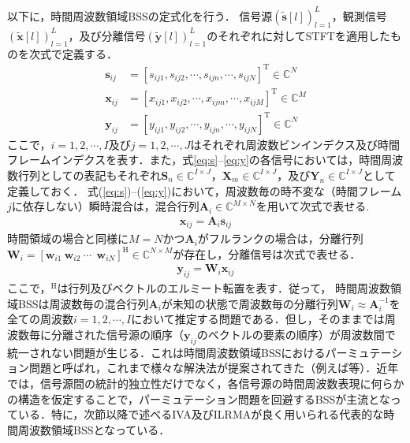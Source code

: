 以下に，時間周波数領域BSSの定式化を行う．
信号源$( \tilde{\bm{s}}[l] )_{l=1}^L$，観測信号$( \tilde{\bm{x}}[l] )_{l=1}^L$，及び分離信号$( \tilde{\bm{y}}[l] )_{l=1}^L$のそれぞれに対して{STFTを適用したものを次式で定義する．}
\begin{align}
\bm{s}_{ij} &= [s_{ij1}, s_{ij2}, \cdots, s_{ijn}, \cdots, s_{ijN}]^{\mathrm{T}} \in \mathbb{C}^{N} \label{eq:s} \\
\bm{x}_{ij} &= [x_{ij1}, x_{ij2}, \cdots, x_{ijm}, \cdots, x_{ijM}]^{\mathrm{T}} \in \mathbb{C}^{M} \label{eq:x} \\
\bm{y}_{ij} &= [y_{ij1}, y_{ij2}, \cdots, y_{ijn}, \cdots, y_{ijN}]^{\mathrm{T}} \in \mathbb{C}^{N} \label{eq:y}
\end{align}
ここで，$i=1, 2,  \cdots, I$及び$j=1, 2,  \cdots, J$はそれぞれ周波数ビンインデクス及び時間フレームインデクスを表す．また，式\eqref{eq:s}--\eqref{eq:y}の各信号においては，時間周波数行列としての表記もそれぞれ$\bm{S}_n\in\mathbb{C}^{{I\times J}}$，$\bm{X}_m\in\mathbb{C}^{{I\times J}}$，及び$\bm{Y}_n\in\mathbb{C}^{{I\times J}}$として定義しておく．
{式(\ref{eq:s})--(\ref{eq:y})において}，周波数毎の時不変な（時間フレーム$j$に依存しない）瞬時混合は，混合行列$\bm{A}_i \in \mathbb{C}^{M\times N}$を用いて次式で表せる.
\begin{align}
  \bm{x}_{ij} = \bm{A}_i \bm{s}_{ij} \label{eq:xas}
\end{align}
時間領域の場合と同様に$M=N$かつ$\bm{A}_i$がフルランクの場合は，分離行列$\bm{W}_{i} = [\bm{w}_{i1}~\bm{w}_{i2}~\cdots~ ~\bm{w}_{iN}]^{\mathrm{H}} \in \mathbb{C}^{N \times M} $が存在し，分離信号は次式で表せる．
\begin{align}
  \bm{y}_{ij} = \bm{W}_i \bm{x}_{ij} \label{eq:ywj}
\end{align}
ここで，$^{\mathrm{H}}$は行列及びベクトルのエルミート転置を表す．従って，
{時間周波数領域BSSは周波数毎の混合行列$\bm{A}_i$が未知の状態で周波数毎の分離行列$\bm{W}_{i} \approx \bm{A}_i^{-1}$}を全ての周波数$i=1, 2, \cdots, I$において推定する問題である．但し，そのままでは周波数毎に分離された信号源の順序（$\bm{y}_{ij}$のベクトルの要素の順序）が周波数間で統一されない問題が生じる．これは時間周波数領域BSSにおけるパーミュテーション問題\cite{permute}と呼ばれ，これまで様々な解決法が提案されてきた（例えば\cite{persolve1,persolve2,persolve3,persolve4}等）．近年では，信号源間の統計的独立性だけでなく，各信号源の時間周波数表現に何らかの構造を仮定することで，パーミュテーション問題を回避するBSSが主流となっている．特に，次節以降で述べるIVA及びILRMAが良く用いられる代表的な時間周波数領域BSSとなっている．


